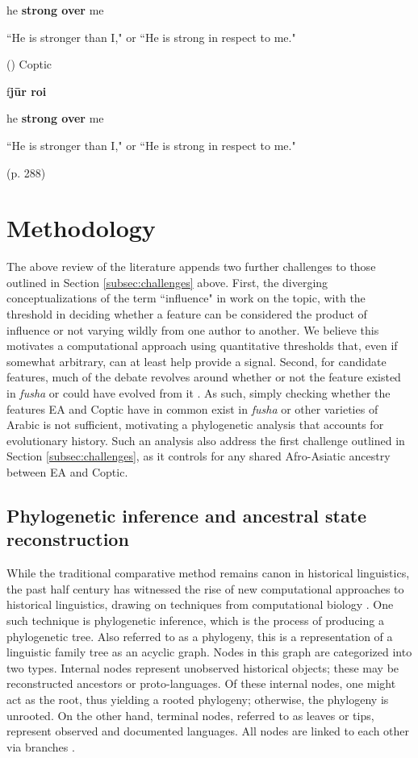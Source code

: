 \documentclass[12pt,a4paper]{article}
\newcounter{example}
\begin{document}
he \textbf{strong over} me

``He is stronger than I," or ``He is strong in respect to me."

\vspace{3mm}
(\theexample) Coptic

f\textbf{jūr \textschwa roi}

he \textbf{strong over} me

``He is stronger than I," or ``He is strong in respect to me."
\begin{flushright}
(p. 288)
\end{flushright}

\section{Methodology}
\label{sec:methodology}

The above review of the literature appends two further challenges to those outlined in Section \ref{subsec:challenges} above. First, the diverging conceptualizations of the term ``influence" in work on the topic, with the threshold in deciding whether a feature can be considered the product of influence or not varying wildly from one author to another. We believe this motivates a computational approach using quantitative thresholds that, even if somewhat arbitrary, can at least help provide a signal. Second, for candidate features, much of the debate revolves around whether or not the feature existed in \textit{fusha} or could have evolved from it \parencite{palva_notes_1969, versteegh_whats_2004, diem_negation_2014}. As such, simply checking whether the features EA and Coptic have in common exist in \textit{fusha} or other varieties of Arabic is not sufficient, motivating a phylogenetic analysis that accounts for evolutionary history. Such an analysis also address the first challenge outlined in Section \ref{subsec:challenges}, as it controls for any shared Afro-Asiatic ancestry between EA and Coptic.

\subsection{Phylogenetic inference and ancestral state reconstruction}

While the traditional comparative method remains canon in historical linguistics, the past half century has witnessed the rise of new computational approaches to historical linguistics, drawing on techniques from computational biology \parencite{kiparsky_new_2015, jager_computational_2019}. One such technique is phylogenetic inference, which is the process of producing a phylogenetic tree. Also referred to as a phylogeny, this is a representation of a linguistic family tree as an acyclic graph. Nodes in this graph are categorized into two types. Internal nodes represent unobserved historical objects; these may be reconstructed ancestors or proto-languages. Of these internal nodes, one  might act as the root, thus yielding a rooted phylogeny; otherwise, the phylogeny is unrooted. On the other hand, terminal nodes, referred to as leaves or tips, represent observed and documented languages. All nodes are linked to each other via branches \parencite{jager_computational_2019}. 
\end{document}
